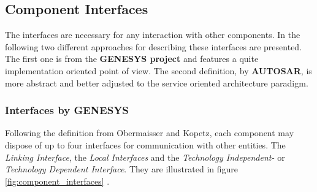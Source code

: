 \subsection{Component Interfaces}
\label{sec:component_interfaces}


The interfaces are necessary for any interaction with other components. In the following two different approaches for describing these interfaces are presented. The first one is from the \textbf{GENESYS project} and features a quite implementation oriented point of view. The second definition, by \textbf{AUTOSAR}, is more abstract and better adjusted to the service oriented architecture paradigm.



\subsubsection{Interfaces by GENESYS}
Following the definition from Obermaisser and Kopetz, each component may dispose of up to four interfaces for communication with other entities. The \emph{Linking Interface}, the \emph{Local Interfaces} and the \emph{Technology Independent-} or \emph{Technology Dependent Interface}. They are illustrated in figure \ref{fig:component_interfaces} \cite[p.40-41]{genesys}.

